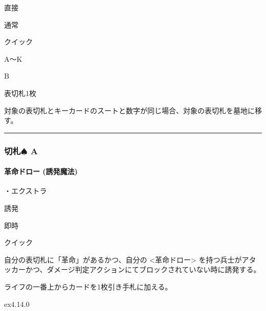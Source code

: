 \documentclass[letterpaper,10pt,dvipdfmx]{sphinxmanual}
\begin{document}
\sphinxAtStartPar
{} 直接

\sphinxAtStartPar
{} 通常

\sphinxAtStartPar
{} クイック

\sphinxAtStartPar
{} A〜K

\sphinxAtStartPar
{} B

\sphinxAtStartPar
{}

\sphinxAtStartPar
表切札1枚

\sphinxAtStartPar
{}

\sphinxAtStartPar
対象の表切札とキーカードのスートと数字が同じ場合、対象の表切札を墓地に移す。


\bigskip\hrule\bigskip



\subsubsection{切札{\normalsize $\spadesuit$} A}
\label{\detokenize{auto/frameActionlist:a}}

\paragraph{革命ドロー (誘発魔法)}
\label{\detokenize{auto/frameActionlist:act-revolutiondraw}}\label{\detokenize{auto/frameActionlist:id14}}
\sphinxAtStartPar
{}

\sphinxAtStartPar
・エクストラ

\sphinxAtStartPar
{} 誘発

\sphinxAtStartPar
{} 即時

\sphinxAtStartPar
{} クイック

\sphinxAtStartPar
{}

\sphinxAtStartPar
自分の表切札に「革命」があるかつ、自分の \textless{}革命ドロー\textgreater{} を持つ兵士がアタッカーかつ、ダメージ判定アクションにてブロックされていない時に誘発する。

\sphinxAtStartPar
{}

\sphinxAtStartPar
ライフの一番上からカードを1枚引き手札に加える。

\sphinxAtStartPar
{}  ex4.14.0
\end{document}
